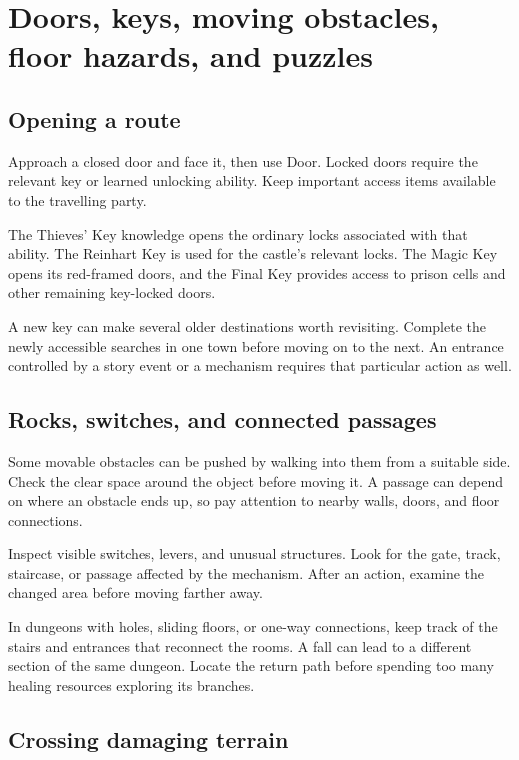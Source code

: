 \section{Doors, keys, moving obstacles, floor hazards, and puzzles}

\subsection*{Opening a route}

Approach a closed door and face it, then use Door. Locked doors require
the relevant key or learned unlocking ability. Keep important access
items available to the travelling party.

The Thieves' Key knowledge opens the ordinary locks associated with that
ability. The Reinhart Key is used for the castle's relevant locks. The
Magic Key opens its red-framed doors, and the Final Key provides access
to prison cells and other remaining key-locked doors.

A new key can make several older destinations worth revisiting. Complete
the newly accessible searches in one town before moving on to the next.
An entrance controlled by a story event or a mechanism requires that
particular action as well.

\subsection*{Rocks, switches, and connected passages}

Some movable obstacles can be pushed by walking into them from a suitable
side. Check the clear space around the object before moving it. A passage
can depend on where an obstacle ends up, so pay attention to nearby walls,
doors, and floor connections.

Inspect visible switches, levers, and unusual structures. Look for the
gate, track, staircase, or passage affected by the mechanism. After an
action, examine the changed area before moving farther away.

In dungeons with holes, sliding floors, or one-way connections, keep track
of the stairs and entrances that reconnect the rooms. A fall can lead to
a different section of the same dungeon. Locate the return path before
spending too many healing resources exploring its branches.

\subsection*{Crossing damaging terrain}

